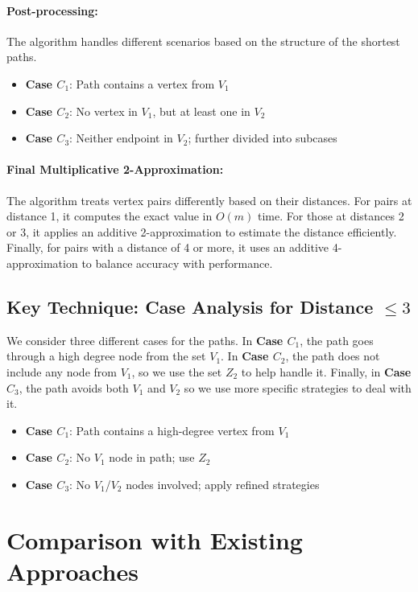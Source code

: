 \documentclass[a4paper,11pt,oneside]{book}
\begin{document}
\paragraph{ Post-processing:}
The algorithm handles different scenarios based on the structure of the shortest paths.

\begin{itemize}
    \item \textbf{Case $C_1$}: Path contains a vertex from $V_1$
    \item \textbf{Case $C_2$}: No vertex in $V_1$, but at least one in $V_2$
    \item \textbf{Case $C_3$}: Neither endpoint in $V_2$; further divided into subcases
\end{itemize}

\paragraph{Final Multiplicative 2-Approximation:}
The algorithm treats vertex pairs differently based on their distances. For pairs at distance 1, it computes the exact value in \(O(m)\) time. For those at distances 2 or 3, it applies an additive 2-approximation to estimate the distance efficiently. Finally, for pairs with a distance of 4 or more, it uses an additive 4-approximation to balance accuracy with performance.


\subsection*{Key Technique: Case Analysis for Distance $\leq 3$}
We consider three different cases for the paths. In \textbf{Case $C_1$}, the path goes through a high degree node from the set \(V_1\). In \textbf{Case $C_2$}, the path does not include any node from \(V_1\), so we use the set \(Z_2\) to help handle it. Finally, in \textbf{Case $C_3$}, the path avoids both \(V_1\) and \(V_2\) so we use more specific strategies to deal with it.

\begin{itemize}
    \item \textbf{Case $C_1$}: Path contains a high-degree vertex from $V_1$
    \item \textbf{Case $C_2$}: No $V_1$ node in path; use $Z_2$
    \item \textbf{Case $C_3$}: No $V_1$/$V_2$ nodes involved; apply refined strategies
\end{itemize}

\section*{Comparison with Existing Approaches}
\end{document}
